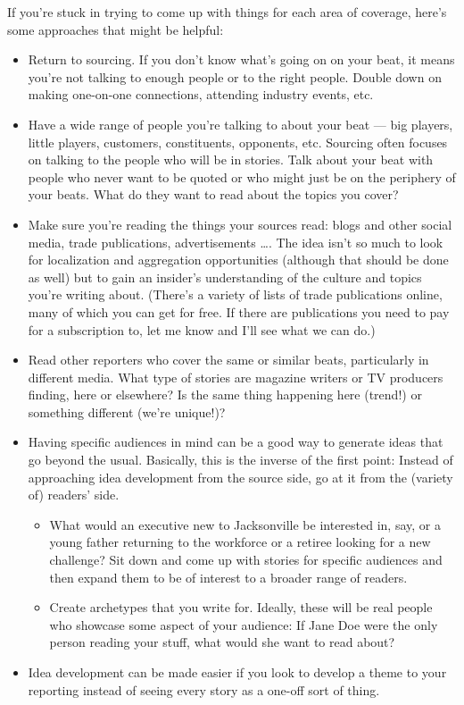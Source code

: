 \documentclass[
  11pt,
  american,
  letterpaperpaper,
  extrafontsizes,onecolumn,openright
  ]{memoir}
\providecommand{\tightlist}{%
  \setlength{\itemsep}{0pt}\setlength{\parskip}{0pt}}
\begin{document}
If you're stuck in trying to come up with things for each area of coverage, here's some approaches that might be helpful:

\begin{itemize}
\tightlist
\item
  Return to sourcing. If you don't know what's going on on your beat, it means you're not talking to enough people or to the right people. Double down on making one-on-one connections, attending industry events, etc.
\item
  Have a wide range of people you're talking to about your beat --- big players, little players, customers, constituents, opponents, etc. Sourcing often focuses on talking to the people who will be in stories. Talk about your beat with people who never want to be quoted or who might just be on the periphery of your beats. What do they want to read about the topics you cover?
\item
  Make sure you're reading the things your sources read: blogs and other social media, trade publications, advertisements \ldots. The idea isn't so much to look for localization and aggregation opportunities (although that should be done as well) but to gain an insider's understanding of the culture and topics you're writing about. (There's a variety of lists of trade publications online, many of which you can get for free. If there are publications you need to pay for a subscription to, let me know and I'll see what we can do.)
\item
  Read other reporters who cover the same or similar beats, particularly in different media. What type of stories are magazine writers or TV producers finding, here or elsewhere? Is the same thing happening here (trend!) or something different (we're unique!)?
\item
  Having specific audiences in mind can be a good way to generate ideas that go beyond the usual. Basically, this is the inverse of the first point: Instead of approaching idea development from the source side, go at it from the (variety of) readers' side.

  \begin{itemize}
  \tightlist
  \item
    What would an executive new to Jacksonville be interested in, say, or a young father returning to the workforce or a retiree looking for a new challenge? Sit down and come up with stories for specific audiences and then expand them to be of interest to a broader range of readers.
  \item
    Create archetypes that you write for. Ideally, these will be real people who showcase some aspect of your audience: If Jane Doe were the only person reading your stuff, what would she want to read about?
  \end{itemize}
\item
  Idea development can be made easier if you look to develop a theme to your reporting instead of seeing every story as a one-off sort of thing.


\end{itemize}
\end{document}
